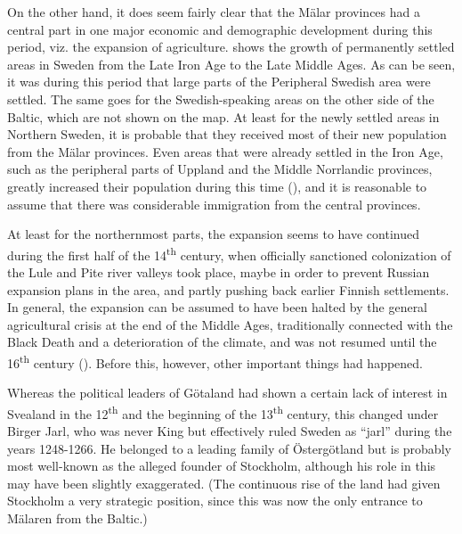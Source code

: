 On the other hand, it does seem fairly clear that the Mälar provinces had a central part in one major economic and demographic development during this period, viz. the expansion of agriculture.  shows the growth of permanently settled areas in Sweden from the Late Iron Age to the Late Middle Ages. As can be seen, it was during this period that large parts of the Peripheral Swedish area were settled. The same goes for the Swedish-speaking areas on the other side of the Baltic, which are not shown on the map. At least for the newly settled areas in Northern Sweden, it is probable that they received most of their new population from the Mälar provinces. Even areas that were already settled in the Iron Age, such as the peripheral parts of Uppland and the Middle Norrlandic provinces, greatly increased their population during this time (\citet{Broberg1990}), and it is reasonable to assume that there was considerable immigration from the central provinces. 

At least for the northernmost parts, the expansion seems to have continued during the first half of the 14\textsuperscript{th} century, when officially sanctioned colonization of the Lule and Pite river valleys took place, maybe in order to prevent Russian expansion plans in the area, and partly pushing back earlier Finnish settlements. In general, the expansion can be assumed to have been halted by the general agricultural crisis at the end of the Middle Ages, traditionally connected with the Black Death and a deterioration of the climate, and was not resumed until the 16\textsuperscript{th} century (\citet[248]{Myrdal2003}). Before this, however, other important things had happened.

Whereas the political leaders of Götaland had shown a certain lack of interest in Svealand in the 12\textsuperscript{th} and the beginning of the 13\textsuperscript{th} century, this changed under Birger Jarl, who was never King but effectively ruled Sweden as “jarl” during the years 1248-1266. He belonged to a leading family of Östergötland but is probably most well-known as the alleged founder of Stockholm, although his role in this may have been slightly exaggerated. (The continuous rise of the land had given Stockholm a very strategic position, since this was now the only entrance to Mälaren from the Baltic.)

